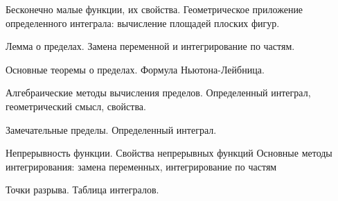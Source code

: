 \documentclass[
	14pt,
	a4paper,
	]
	{scrartcl}
\begin{document}
\vfill

\newpage


\shapk
{}
\setcounter{zad}{0}

\vfill
\z 	Бесконечно малые функции, их свойства.
 \vfill
\z 	Геометрическое приложение определенного интеграла: вычисление площадей плоских фигур.
 \vfill

\vfill

\newpage


\shapk
{}
\setcounter{zad}{0}

\vfill
\z 	Лемма о пределах.
 \vfill
\z 	Замена переменной и интегрирование по частям.
 \vfill

\vfill

\newpage


\shapk
{}
\setcounter{zad}{0}

\vfill
\z 	Основные теоремы о пределах.
 \vfill
\z 	Формула Ньютона-Лейбница.
 \vfill

\vfill

\newpage


\shapk
{}
\setcounter{zad}{0}

\vfill
\z 	Алгебраические методы вычисления пределов.
 \vfill
\z 	Определенный интеграл, геометрический смысл, свойства.
 \vfill

\vfill

\newpage


\shapk
{}
\setcounter{zad}{0}

\vfill
\z 	Замечательные пределы.
 \vfill
\z 	Определенный интеграл.
 \vfill

\vfill

\newpage


\shapk
{}
\setcounter{zad}{0}

\vfill
\z 	Непрерывность функции. Свойства непрерывных функций
 \vfill
\z 	Основные методы интегрирования: замена переменных, интегрирование по частям
 \vfill

\vfill

\newpage


\shapk
{}
\setcounter{zad}{0}

\vfill
\z 	Точки разрыва.
 \vfill
\z 	Таблица интегралов.
 \vfill

\vfill

\newpage


\shapk
{}
\setcounter{zad}{0}
\end{document}
